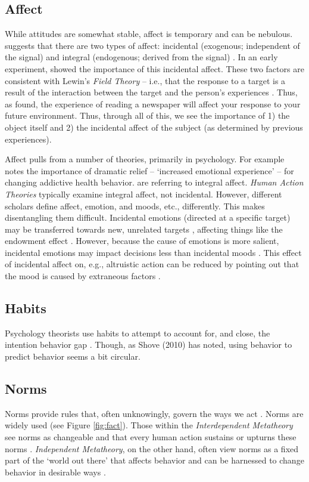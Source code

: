 \documentclass[12 pt]{article}
\begin{document}
		\subsection{Affect}
		 While attitudes are somewhat stable, affect is temporary and can be nebulous. \textcite{Vastfjall2016} suggests that there are two types of affect: incidental (exogenous; independent of the signal) and integral (endogenous; derived from the signal) \parencite{Loewenstein2002}. In an early experiment, \textcite{Johnson1983} showed the importance of this incidental affect. These two factors are consistent with Lewin's \textit{Field Theory} -- i.e., that the response to a target is a result of the interaction between the target and the person's experiences \parencite{Lewin1939}. Thus, as \textcite{Johnson1983} found, the experience of reading a newspaper will affect your response to your future environment. Thus, through all of this, we see the importance of 1) the object itself and 2) the incidental affect of the subject (as determined by previous experiences). 
		
		Affect pulls from a number of theories, primarily in psychology. For example \parencite{Prochaska1997} notes the importance of dramatic relief -- `increased emotional experience' -- for changing addictive health behavior. \textcite{Prochaska1997} are referring to integral affect. \textit{Human Action Theories} typically examine integral affect, not incidental.  However, different scholars define affect, emotion, and moods, etc., differently. This makes disentangling them difficult. Incidental emotions (directed at a specific target) may be transferred towards new, unrelated targets \parencite{Loewenstein2002}, affecting things like the endowment effect \parencite{Lerner2004}. However, because the cause of emotions is more salient, incidental emotions may impact decisions less than incidental moods \parencite{Vastfjall2016}.  This effect of incidental affect on, e.g., altruistic action can be reduced by pointing out that the mood is caused by extraneous factors \parencite{Schwarz1983,Schwarz2012}. 
		\subsection{Habits}
		Psychology theorists use habits to attempt to account for, and close, the intention behavior gap \parencite{DeBruijn2007,Gardner2011}. Though, as Shove (2010) has noted, using behavior to predict behavior seems a bit circular. 
		\subsection{Norms}
		Norms provide rules that, often unknowingly, govern the ways we act \parencite{Raymond2014}. Norms are widely used (see Figure \ref{fig:fact}).  Those within the \textit{Interdependent Metatheory} see norms as changeable and that every human action sustains or upturns these norms \parencite[e.g.,][]{Raymond2014}. \textit{Independent Metatheory}, on the other hand, often view norms as a fixed part of the `world out there' that affects behavior and can be harnessed to change behavior in desirable ways \parencite[e.g.,][]{Ajzen1985,Schultz2007}. 
\end{document}
